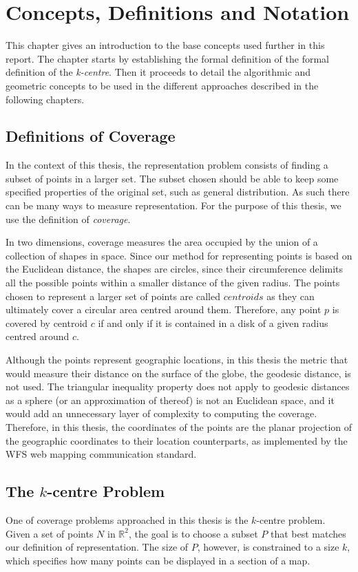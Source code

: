 \cleardoublepage  
\chapter{Concepts, Definitions and Notation}
\label{chap:theory}
\vspace{-15pt}
This chapter gives an introduction to the base concepts used further in this report.
The chapter starts by establishing the formal definition of the formal definition of the \emph{k-centre}. 
Then it proceeds to detail the algorithmic and geometric concepts to be used in the different approaches described in the following chapters.
\section{Definitions of Coverage}
\label{sect:problem}
In the context of this thesis, the representation problem consists of finding a subset of points in a larger set. The subset chosen should be able to keep some specified properties of the original set, such as general distribution. As such there can be many ways to measure representation. For the purpose of this thesis, we use the definition of \emph{coverage}.

In two dimensions, coverage measures the area occupied by the union of a collection of shapes in space.  Since our method for representing points is based on the Euclidean distance, the shapes are circles, since their circumference delimits all the possible points within a smaller distance of the given radius. The points chosen to represent a larger set of points are called $centroids$ as they can ultimately cover a circular area centred around them. Therefore, any point $p$ is covered by centroid $c$ if and only if it is contained in a disk of a given radius centred around $c$.

Although the points represent geographic locations, in this thesis the metric that would measure their distance on the surface of the globe, the geodesic distance, is not used. The triangular inequality property does not apply to geodesic distances as a sphere (or an approximation of thereof) is not an Euclidean space, and it would add an unnecessary layer of complexity to computing the coverage.
Therefore, in this thesis, the coordinates of the points are the planar projection of the geographic coordinates to their location counterparts, as implemented by the WFS web mapping communication standard.

\section{The $k$-centre Problem}
\label{alg:ilp}
One of coverage problems approached in this thesis is the $k$-centre problem. Given a set of points $N$ in $\mathbb{R}^2$, the goal is to choose a subset $P$ that best matches our definition of representation.
The size of $P$, however, is constrained to a size $k$, which specifies how many points can be displayed in a section of a map.

